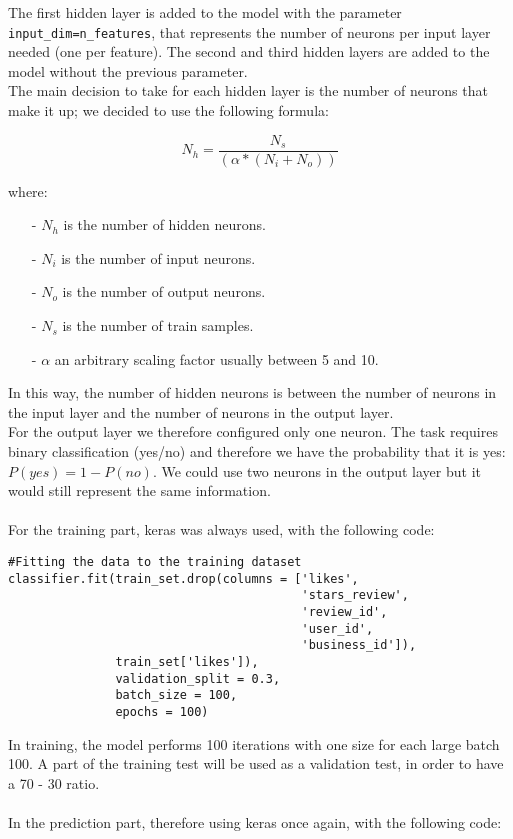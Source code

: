 The first hidden layer is added to the model with the parameter \texttt{input\_dim=n\_features}, that represents the number of neurons per input layer needed (one per feature). The second and third hidden layers are added to the model without the previous parameter.\\
The main decision to take for each hidden layer is the number of neurons that make it up; we decided to use the following formula:

\begin{equation}
    N_h = \frac{N_s}{(\alpha * (N_i + N_o))}
\end{equation}
 
where:
\begin{itemize}

\item[-] $N_h$ is the number of hidden neurons.

\item[-] $N_i$ is the number of input neurons.

\item[-] $N_o$ is the number of output neurons.

\item[-] $N_s$ is the number of train samples.

\item[-] $\alpha$ an arbitrary scaling factor usually between 5 and 10.  

\end{itemize}

In this way, the number of hidden neurons is between the number of neurons in the input layer and the number of neurons in the output layer.\\
For the output layer we therefore configured only one neuron. The task requires binary classification (yes/no) and therefore we have the probability that it is yes: $P(yes) = 1 - P(no)$. We could use two neurons in the output layer but it would still represent the same information.\\
\\
For the training part, keras was always used, with the following code:

\begin{lstlisting}
#Fitting the data to the training dataset
classifier.fit(train_set.drop(columns = ['likes', 
                                         'stars_review', 
                                         'review_id', 
                                         'user_id', 
                                         'business_id']), 
               train_set['likes']), 
               validation_split = 0.3, 
               batch_size = 100, 
               epochs = 100)
\end{lstlisting}
In training, the model performs 100 iterations with one size for each large batch 100. A part of the training test will be used as a validation test, in order to have a 70 - 30 ratio.\\
\\
In the prediction part, therefore using keras once again, with the following code:

